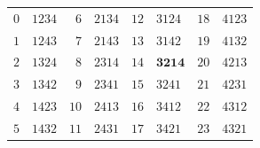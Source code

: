 \begin{tabular}{rl|rl|rl|rl}
$0$ & $1234$ & $6$ & $2134$ & $12$ & $3124$ & $18$ & $4123$ \\
$1$ & $1243$ & $7$ & $2143$ & $13$ & $3142$ & $19$ & $4132$ \\
$2$ & $1324$ & $8$ & $2314$ & $14$ & $\mathbf{3214}$ & $20$ & $4213$ \\
$3$ & $1342$ & $9$ & $2341$ & $15$ & $3241$ & $21$ & $4231$ \\
$4$ & $1423$ & $10$ & $2413$ & $16$ & $3412$ & $22$ & $4312$ \\
$5$ & $1432$ & $11$ & $2431$ & $17$ & $3421$ & $23$ & $4321$ \\
\end{tabular}
